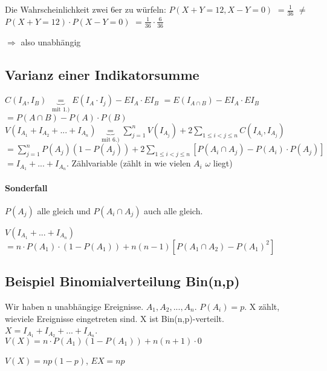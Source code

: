 Die Wahrscheinlichkeit zwei 6er zu würfeln: 
$ P(X+Y = 12, X-Y=0)$ 
$=\frac{1}{36}$
$\neq$
$P(X+Y=12) \cdot P(X-Y=0)$ 
$=\frac{1}{36} \cdot \frac{6}{36}$

$\Rightarrow$ also unabhängig

\subsection{Varianz einer Indikatorsumme}
$C(I_A, I_B) $
$\underbrace{=}_{\textrm{mit 1.)}} E(I_A\cdot I_j) - EI_A \cdot EI_B$
$=E(I_{A\cap B})- EI_A\cdot EI_B $
$=P(A\cap B) - P(A) \cdot P(B)$\\

$V(I_{A_1} + I_{A_2} + ... + I_{A_n})$
$\underbrace{=}_{\textrm{mit 6.)}} \sum_{j=1}^{n} V(I_{A_j}) +2 \sum_{1\leq i < j \leq n} C(I_{A_i}, I_{A_j})$
$=\sum_{j=1}^{n} P(A_j) (1-P(A_j)) +2 \sum_{1\leq i < j \leq n} [P(A_i\cap A_j) - P(A_i) \cdot P(A_j)]$
$=I_{A_1} + ... + I_{A_n} $. Zählvariable (zählt in wie vielen $A_i$ $\omega$ liegt)

\paragraph{Sonderfall}
$P(A_j)$ alle gleich und $P(A_i\cap A_j)$ auch alle gleich. 

$V(I_{A_1} + ... + I_{A_n})$
$=n\cdot P(A_1) \cdot (1-P(A_1)) + n(n-1) [P(A_1\cap A_2) - P(A_1)^2]$

\subsection{Beispiel Binomialverteilung Bin(n,p)}
Wir haben n unabhängige Ereignisse. $A_1, A_2, ..., A_n$. $P(A_i) = p$. X zählt, wieviele Ereignisse eingetreten sind. X ist Bin(n,p)-verteilt. 
$ X = I_{A_1} + I_{A_2} + ... + I_{A_n}$.\\

$V(X) = n\cdot P(A_1) (1-P(A_1)) + n(n+1)\cdot 0$

$V(X) = n p(1-p)$, $ EX = np$